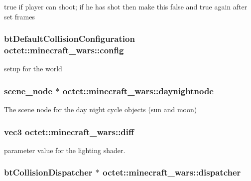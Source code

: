 true if player can shoot; if he has shot then make this false and true again after set frames 

\hypertarget{classoctet_1_1minecraft__wars_a0c7e9c9bea5aa8288253f9617d02967c}{
\subsubsection[{config}]{\setlength{\rightskip}{0pt plus 5cm}bt\+Default\+Collision\+Configuration octet\+::minecraft\+\_\+wars\+::config\hspace{0.3cm}{\ttfamily [private]}}}\label{classoctet_1_1minecraft__wars_a0c7e9c9bea5aa8288253f9617d02967c}


setup for the world 

\hypertarget{classoctet_1_1minecraft__wars_ac658c13a9f41b84fb89156ca0cb4b9f1}{
\subsubsection[{daynightnode}]{\setlength{\rightskip}{0pt plus 5cm}scene\+\_\+node $\ast$ octet\+::minecraft\+\_\+wars\+::daynightnode\hspace{0.3cm}{\ttfamily [private]}}}\label{classoctet_1_1minecraft__wars_ac658c13a9f41b84fb89156ca0cb4b9f1}


The scene node for the day night cycle objects (sun and moon) 

\hypertarget{classoctet_1_1minecraft__wars_affef81405c5dad0bc10c409781719645}{
\subsubsection[{diff}]{\setlength{\rightskip}{0pt plus 5cm}vec3 octet\+::minecraft\+\_\+wars\+::diff\hspace{0.3cm}{\ttfamily [private]}}}\label{classoctet_1_1minecraft__wars_affef81405c5dad0bc10c409781719645}


parameter value for the lighting shader. 

\hypertarget{classoctet_1_1minecraft__wars_aeff7b8c9d268bc27c1dcf5ddac645cc9}{
\subsubsection[{dispatcher}]{\setlength{\rightskip}{0pt plus 5cm}bt\+Collision\+Dispatcher $\ast$ octet\+::minecraft\+\_\+wars\+::dispatcher\hspace{0.3cm}{\ttfamily [private]}}}\label{classoctet_1_1minecraft__wars_aeff7b8c9d268bc27c1dcf5ddac645cc9}


